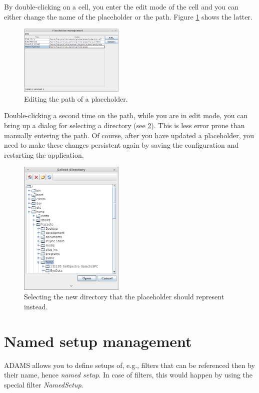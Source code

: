 \clearpage
{}
By double-clicking on a cell, you enter the edit mode of the cell and you can
either change the name of the placeholder or the path. Figure
\ref{placeholdermanagement-edit1} shows the latter.
\begin{figure}[htb]
  \centering
  \includegraphics[width=5.0cm]{images/placeholdermanagement-edit1.png}
  \caption{Editing the path of a placeholder.}
  \label{placeholdermanagement-edit1}
\end{figure}

Double-clicking a second time on the path, while you are in edit mode, you can
bring up a dialog for selecting a directory (see
\ref{placeholdermanagement-edit2}). This is less error prone than manually
entering the path. Of course, after you have updated a placeholder, you need to
make these changes persistent again by saving the configuration and restarting
the application.
\begin{figure}[htb]
  \centering
  \includegraphics[width=5.0cm]{images/placeholdermanagement-edit2.png}
  \caption{Selecting the new directory that the placeholder should represent instead.}
  \label{placeholdermanagement-edit2}
\end{figure}

\clearpage
\newpage
\section{Named setup management}
ADAMS allows you to define setups of, e.g., filters that can be referenced 
then by their name, hence \textit{named setup}. In case of filters, this would 
happen by using the special filter \textit{NamedSetup}. 

